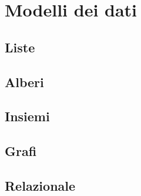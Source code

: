 \chapter{Modelli dei dati}
\section{Liste}
\section{Alberi}
\section{Insiemi}
\section{Grafi}
\section{Relazionale}
